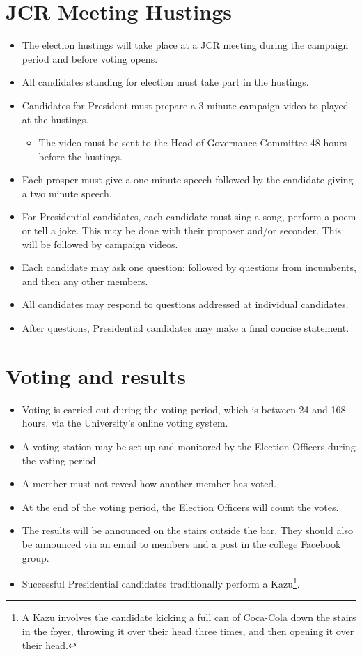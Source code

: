 \documentclass[12pt]{article}
\begin{document}
    \section{JCR Meeting Hustings}
    \begin{itemize}
        \item The election hustings will take place at a JCR meeting during the campaign period and
        before voting opens.
        \item All candidates standing for election must take part in the hustings.
        \item Candidates for President must prepare a 3-minute campaign video to played at the
        hustings.
        \begin{itemize}
            \item The video must be sent to the Head of Governance Committee 48 hours before the hustings.
        \end{itemize}
        \item Each prosper must give a one-minute speech followed by the candidate giving a two minute speech.
        \item For Presidential candidates, each candidate must sing a song, perform a poem or tell a joke. This may be done with their proposer and/or seconder. This will be followed by campaign videos.
        \item Each candidate may ask one question; followed by questions from incumbents, and then any other members.
        \item All candidates may respond to questions addressed at individual candidates.
        \item After questions, Presidential candidates may make a final concise statement.
    \end{itemize}

    \section{Voting and results}
    \begin{itemize}
        \item Voting is carried out during the voting period, which is between 24 and 168 hours, via the University's online voting system.
        \item A voting station may be set up and monitored by the Election Officers during the voting period.
        \item A member must not reveal how another member has voted.
        \item At the end of the voting period, the Election Officers will count the votes.
        \item The results will be announced on the stairs outside the bar. They should also be announced via an email to members and a post in the college Facebook group.
        \item Successful Presidential candidates traditionally perform a Kazu\footnote{A Kazu involves the candidate kicking a full can of Coca-Cola down the stairs in the foyer, throwing it over their head three times, and then opening it over their head.}.
    \end{itemize}
\end{document}

